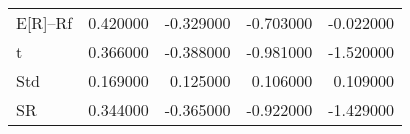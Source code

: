 \begin{tabular}{lrrrr}
\toprule
\midrule
E[R]--Rf & 0.420000 & -0.329000 & -0.703000 & -0.022000 \\
t & 0.366000 & -0.388000 & -0.981000 & -1.520000 \\
Std & 0.169000 & 0.125000 & 0.106000 & 0.109000 \\
SR & 0.344000 & -0.365000 & -0.922000 & -1.429000 \\
\bottomrule
\end{tabular}
